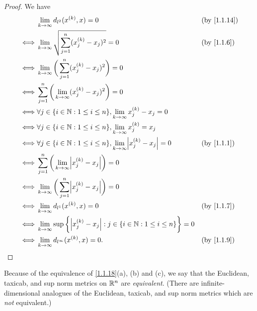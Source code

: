 \begin{proof}
  We have
  \begin{align*}
         & \lim_{k \to \infty} d_{l^2}(x^{(k)}, x) = 0                                                            &  & \text{(by \cref{1.1.14})} \\
    \iff & \lim_{k \to \infty} \sqrt{\sum_{j = 1}^n (x_j^{(k)} - x_j)^2} = 0                                      &  & \by{1.1.6}                \\
    \iff & \lim_{k \to \infty} \bigg(\sum_{j = 1}^n (x_j^{(k)} - x_j)^2\bigg) = 0                                                                \\
    \iff & \sum_{j = 1}^n \bigg(\lim_{k \to \infty} (x_j^{(k)} - x_j)^2\bigg) = 0                                                                \\
    \iff & \forall j \in \{i \in \N : 1 \leq i \leq n\}, \lim_{k \to \infty} x_j^{(k)} - x_j = 0                                                 \\
    \iff & \forall j \in \{i \in \N : 1 \leq i \leq n\}, \lim_{k \to \infty} x_j^{(k)} = x_j                                                     \\
    \iff & \forall j \in \{i \in \N : 1 \leq i \leq n\}, \lim_{k \to \infty} \abs{x_j^{(k)} - x_j} = 0            &  & \by{1.1.1}                \\
    \iff & \sum_{j = 1}^n \bigg(\lim_{k \to \infty} \abs{x_j^{(k)} - x_j}\bigg) = 0                                                              \\
    \iff & \lim_{k \to \infty} \bigg(\sum_{j = 1}^n \abs{x_j^{(k)} - x_j}\bigg) = 0                                                              \\
    \iff & \lim_{k \to \infty} d_{l^1}(x^{(k)}, x) = 0                                                            &  & \by{1.1.7}                \\
    \iff & \lim_{k \to \infty} \sup\bigg\{\abs{x_j^{(k)} - x_j} : j \in \{i \in \N : 1 \leq i \leq n\}\bigg\} = 0                                \\
    \iff & \lim_{k \to \infty} d_{l^\infty}(x^{(k)}, x) = 0.                                                      &  & \by{1.1.9}
  \end{align*}
\end{proof}

\begin{note}
  Because of the equivalence of \cref{1.1.18}(a), (b) and (c), we say that the Euclidean, taxicab, and sup norm metrics on \(\mathbb{R}^n\) are \emph{equivalent}.
  (There are infinite-dimensional analogues of the Euclidean, taxicab, and sup norm metrics which are \emph{not} equivalent.)
\end{note}

